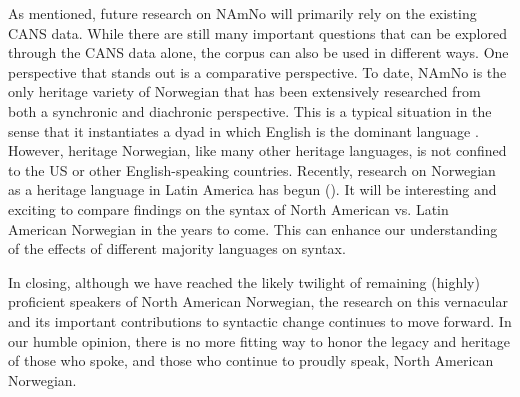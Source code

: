 \documentclass[output=paper,colorlinks,citecolor=brown]{langscibook}
\begin{document}
As mentioned, future research on NAmNo will primarily rely on the existing CANS data. While there are still many important questions that can be explored through the CANS data alone, the corpus can also be used in different ways. One perspective that stands out is a comparative perspective. To date, NAmNo is the only heritage variety of Norwegian that has been extensively researched from both a synchronic and diachronic perspective. This is a typical situation in the sense that it instantiates a dyad in which English is the dominant language  \citep{Scontras2020}. However, heritage Norwegian, like many other heritage languages, is not confined to the US or other English-speaking countries. Recently, research on Norwegian as a heritage language in Latin America has begun (\citealt{KinnEtAl2024, KinnHjeldeLundStokka2024}). It will be interesting and exciting to compare findings on the syntax of North American vs. Latin American Norwegian in the years to come. This can enhance our understanding of the effects of  different majority languages on syntax. 

In closing, although we have reached the likely twilight of remaining (highly) proficient speakers of North American Norwegian, the research on this vernacular and its important contributions to syntactic change continues to move forward. In our humble opinion, there is no more fitting way to honor the legacy and heritage of those who spoke, and those who continue to proudly speak, North American Norwegian.

\printbibliography[heading=subbibliography,notkeyword=this]
\end{document}
